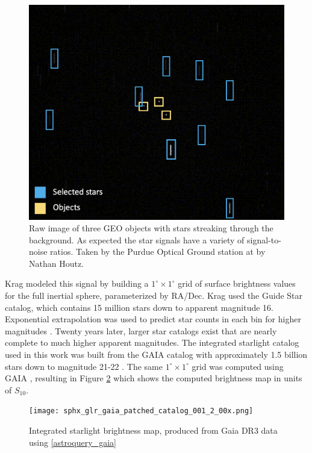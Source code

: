 \begin{figure}[ht]
  \centering
  \includegraphics[width=\figmed]{static_images/static_pogs_annotated.png}
  \caption{Raw image of three GEO objects with stars streaking through the background. As expected the star signals have a variety of signal-to-noise ratios. Taken by the Purdue Optical Ground station at \pogslla by Nathan Houtz.}
  \label{fig:pogs_observation_example}
\end{figure}

Krag \cite{krag2003} modeled this signal by building a $1^\circ \times 1^\circ$ grid of surface
brightness values for the full inertial sphere, parameterized by RA/Dec. Krag used the
Guide Star catalog, which contains 15 million stars down to apparent magnitude 16. Exponential extrapolation
was used to predict star counts in each bin for higher magnitudes \cite{krag2003}. Twenty years later, larger star catalogs exist that are nearly complete to much higher apparent magnitudes. The integrated
starlight catalog used in this work was built from the GAIA catalog with approximately 1.5 billion
stars down to magnitude 21-22 \cite{gaia_dr3}. The same $1^\circ \times 1^\circ$ grid was computed
using GAIA \cite{astroquery_gaia}, resulting in Figure
\ref{fig:gaiapatched} which shows the computed brightness map in units of $S_{10}$. 

\begin{figure}[ht]
  \centering
  \texttt{[image: sphx\_glr\_gaia\_patched\_catalog\_001\_2\_00x.png]}
  \caption{Integrated starlight brightness map, produced from Gaia DR3 data \cite{gaia_dr3} using \ref{astroquery_gaia}}
  \label{fig:gaiapatched}
\end{figure}

